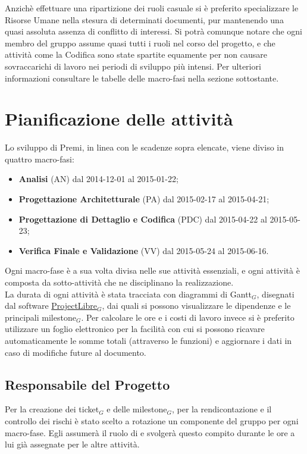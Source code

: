 Anzichè effettuare una ripartizione dei ruoli casuale si è preferito specializzare le Risorse Umane nella stesura di determinati documenti, pur mantenendo una quasi assoluta assenza di conflitto di interessi. Si potrà comunque notare che ogni membro del gruppo assume quasi tutti i ruoli nel corso del progetto, e che attività come la Codifica sono state spartite equamente per non causare sovraccarichi di lavoro nei periodi di sviluppo più intensi. Per ulteriori informazioni consultare le tabelle delle macro-fasi nella sezione sottostante.


\newpage
\section{Pianificazione delle attività}
Lo sviluppo di Premi, in linea con le scadenze sopra elencate, viene diviso in quattro macro-fasi:

\begin{itemize}
\item \textbf{Analisi} (AN) dal 2014-12-01 al 2015-01-22;
\item \textbf{Progettazione Architetturale} (PA) dal 2015-02-17 al 2015-04-21;
\item \textbf{Progettazione di Dettaglio e Codifica} (PDC) dal 2015-04-22 al 2015-05-23;
\item \textbf{Verifica Finale e Validazione} (VV) dal 2015-05-24 al 2015-06-16.
\end{itemize}

Ogni macro-fase è a sua volta divisa nelle sue attività essenziali, e ogni attività è composta da sotto-attività che ne disciplinano la realizzazione.\\
La durata di ogni attività è stata tracciata con diagrammi di Gantt$_{G}$, disegnati dal software \href{http://www.projectlibre.org/}{ProjectLibre}$_{G}$, dai quali si possono visualizzare le dipendenze e le principali milestone$_{G}$. Per calcolare le ore e i costi di lavoro invece si è preferito utilizzare un foglio elettronico per la facilità con cui si possono ricavare automaticamente le somme totali (attraverso le funzioni) e aggiornare i dati in caso di modifiche future al documento.

\subsection{Responsabile del Progetto}
Per la creazione dei ticket$_{G}$ e delle milestone$_{G}$, per la rendicontazione e il controllo dei rischi è stato scelto a rotazione un componente del gruppo per ogni macro-fase.
Egli assumerà il ruolo di \ruoloResponsabile{} e svolgerà questo compito durante le ore a lui già assegnate per le altre attività.

